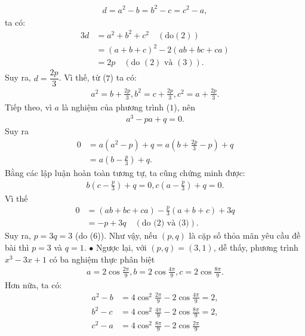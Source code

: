 \begin{multicols}{2}
\begin{align*}
		d = {a^2} - b = {b^2} - c = {c^2} - a, \tag{$7$}
	\end{align*}
	ta có:
	\begin{align*}
		3d &= {a^2} + {b^2} + {c^2}\quad({\text{do}}(2))\\[-0.5ex]
		&= {\left( {a + b + c} \right)^2} - 2\left( {ab + bc + ca} \right)\\[-0.5ex]
		&= 2p \quad({\text{do }}(2){\text{ và }}(3)).
	\end{align*}
	Suy ra, $d = \dfrac{{2p}}{3}$. Vì thế, từ ($7$) ta có:
	\begin{align*}
		{a^2} = b + \frac{{2p}}{3}, {b^2} = c + \frac{{2p}}{3}, {c^2} = a + \frac{{2p}}{3}.
	\end{align*}
	Tiếp theo, vì $a$ là nghiệm của phương trình ($1$), nên
	\begin{align*}
		{a^3} - pa + q = 0.
	\end{align*}
	Suy ra
	\begin{align*}
		0 &= a\left( {{a^2} - p} \right) + q = a\left( {b + \frac{{2p}}{3} - p} \right) + q \\
		&= a\left( {b - \frac{p}{3}} \right) + q.
	\end{align*}
	Bằng các lập luận hoàn toàn tương tự, ta cũng chứng minh được:
	\begin{align*}
		b\left( {c - \frac{p}{3}} \right) + q = 0, c\left( {a - \frac{p}{3}} \right) + q = 0.
	\end{align*}
	Vì thế
	\begin{align*}
		0 &= \left( {ab + bc + ca} \right) - \frac{p}{3}\left( {a + b + c} \right) + 3q \\
		&=  - p + 3q \quad(\text{do ($2$) và ($3$)}).
	\end{align*}
	Suy ra, $p = 3q = 3$ (do ($6$)).
	\vskip 0.05cm
	Như vậy, nếu $(p, q)$ là cặp số thỏa mãn yêu cầu đề bài thì $p = 3$ và $q = 1$.
	\vskip 0.05cm
	$\bullet$ Ngược lại, với $(p, q) = (3, 1)$, dễ thấy, phương trình $x^3 - 3x + 1$ có ba nghiệm thực phân biệt
	\begin{align*}
		a = 2\cos \frac{{2\pi }}{9}, b = 2\cos \frac{{4\pi }}{9}, c = 2\cos \frac{{8\pi }}{9}.
	\end{align*}
	Hơn nữa, ta có:
	\begin{align*}
		{a^2} - b &= 4{\cos ^2}\frac{{2\pi }}{9} - 2\cos \frac{{4\pi }}{9} = 2,\\
		{b^2} - c &= 4{\cos ^2}\frac{{4\pi }}{9} - 2\cos \frac{{8\pi }}{9} = 2,\\
		{c^2} - a &= 4{\cos ^2}\frac{{8\pi }}{9} - 2\cos \frac{{2\pi }}{9} \\

\end{align*}
\end{multicols}
